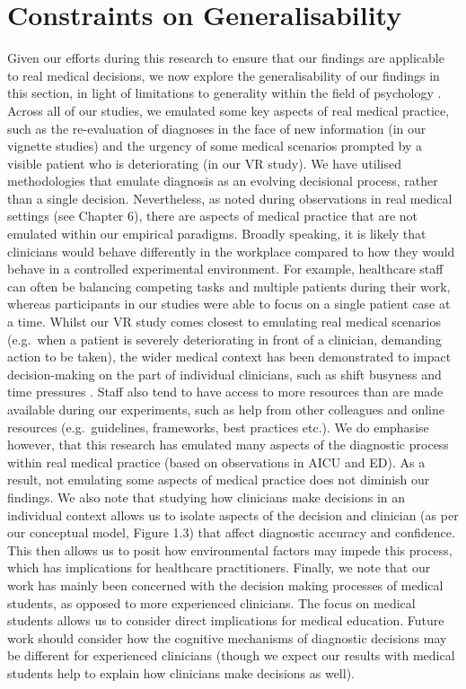 \documentclass[a4paper, nobind]{templates/ociamthesis}
\begin{document}
\section{Constraints on Generalisability}\label{constraints-on-generalisability}

Given our efforts during this research to ensure that our findings are applicable to real medical decisions, we now explore the generalisability of our findings in this section, in light of limitations to generality within the field of psychology \autocite{yarkoni_generalizability_2022}. Across all of our studies, we emulated some key aspects of real medical practice, such as the re-evaluation of diagnoses in the face of new information (in our vignette studies) and the urgency of some medical scenarios prompted by a visible patient who is deteriorating (in our VR study). We have utilised methodologies that emulate diagnosis as an evolving decisional process, rather than a single decision. Nevertheless, as noted during observations in real medical settings (see Chapter 6), there are aspects of medical practice that are not emulated within our empirical paradigms. Broadly speaking, it is likely that clinicians would behave differently in the workplace compared to how they would behave in a controlled experimental environment. For example, healthcare staff can often be balancing competing tasks and multiple patients during their work, whereas participants in our studies were able to focus on a single patient case at a time. Whilst our VR study comes closest to emulating real medical scenarios (e.g.~when a patient is severely deteriorating in front of a clinician, demanding action to be taken), the wider medical context has been demonstrated to impact decision-making on the part of individual clinicians, such as shift busyness and time pressures \autocite{yang2012,soares_accuracy_2019,gupta_associations_2023}. Staff also tend to have access to more resources than are made available during our experiments, such as help from other colleagues and online resources (e.g.~guidelines, frameworks, best practices etc.). We do emphasise however, that this research has emulated many aspects of the diagnostic process within real medical practice (based on observations in AICU and ED). As a result, not emulating some aspects of medical practice does not diminish our findings. We also note that studying how clinicians make decisions in an individual context allows us to isolate aspects of the decision and clinician (as per our conceptual model, Figure 1.3) that affect diagnostic accuracy and confidence. This then allows us to posit how environmental factors may impede this process, which has implications for healthcare practitioners. Finally, we note that our work has mainly been concerned with the decision making processes of medical students, as opposed to more experienced clinicians. The focus on medical students allows us to consider direct implications for medical education. Future work should consider how the cognitive mechanisms of diagnostic decisions may be different for experienced clinicians (though we expect our results with medical students help to explain how clinicians make decisions as well).
\end{document}
